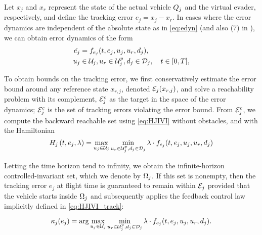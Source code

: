 
Let $x_j$ and $x_r$ represent the state of the actual vehicle $Q_j$ and the virtual evader, respectively, and define the tracking error $e_j=x_j-x_r$. In cases where the error dynamics are independent of the absolute state as in \eqref{eq:edyn} (and also (7) in \cite{Mitchell05}), we can obtain error dynamics of the form
\begin{equation}
\label{eq:edyn} %
\begin{aligned}
\dot{e_j} &= f_{e_j}(t, e_j, u_j, u_r,d_j), \\
u_j &\in \cset_j, u_r\in\cset^p_j, d_j \in \dset_j, \quad t \in [0, T],
\end{aligned}
\end{equation}

To obtain bounds on the tracking error, we first conservatively estimate the error bound around any reference state $x_{r,j}$, denoted $\mathcal{E}_j(x_{r,j})$, and solve a reachability problem with its complement, $\mathcal{E}_j^c$ as the target in the space of the error dynamics; $\mathcal{E}_j^c$ is the set of tracking errors violating the error bound. From $\mathcal{E}_j^c$, we compute the backward reachable set using \eqref{eq:HJIVI} without obstacles, and with the Hamiltonian
\vspace{-0.5em}
\begin{equation}
\label{eq:HJIVI_track}
H_j\left(t, e_j, \lambda\right) = \max_{u_j \in \mathcal{U}_j} \min_{u_r \in\mathcal{U}^p_j, d_j \in \mathcal{D}_j} \lambda \cdot f_{e_j}(t, e_j, u_j, u_r,d_j)
\end{equation}

Letting the time horizon tend to infinity, we obtain the infinite-horizon controlled-invariant set, which we denote by $\Omega_j$. If this set is nonempty, then the tracking error $e_j$ at flight time is guaranteed to remain within $\mathcal{E}_j$ provided that the vehicle starts inside $\Omega_j$ and subsequently applies the feedback control law implicitly defined in \eqref{eq:HJIVI_track}:

\vspace{-1.5em}
\begin{equation}
\label{eq:robust_tracking_law}
\kappa_j(e_j) = \arg\max_{u_j \in \mathcal{U}_j} \min_{u_r \in\mathcal{U}^p_j, d_j \in \mathcal{D}_j} \lambda \cdot f_{e_j}(t,e_j,u_j,u_r,d_j).
\end{equation}

